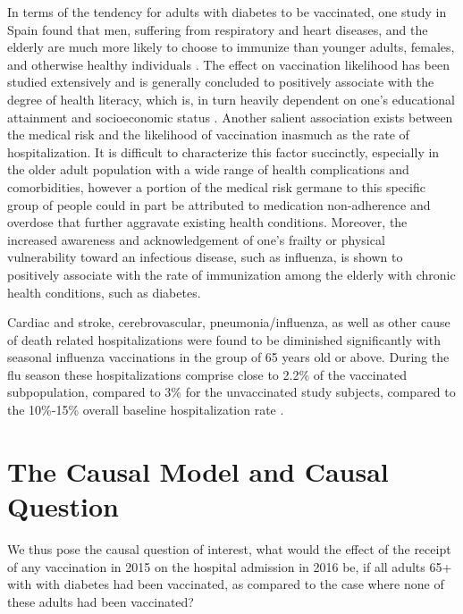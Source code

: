 \documentclass[english, 12pt]{article}
\begin{document}
In terms of the tendency for adults with diabetes to be vaccinated, one study in Spain found that men, suffering from respiratory and heart diseases, and the elderly are much more likely to choose to immunize than younger adults, females, and otherwise healthy individuals \cite{Jimenez-Garcia}. The effect on vaccination likelihood has been studied extensively and is generally concluded to  positively associate with the degree of health literacy, which is, in turn heavily dependent on one’s educational attainment and socioeconomic status \cite{Howard}. Another salient association exists between the medical risk and the likelihood of vaccination inasmuch as the rate of hospitalization. It is difficult to characterize this factor succinctly, especially in the older adult population with a wide range of health complications and comorbidities, however a portion of the medical risk germane to this specific group of people could in part be attributed to medication non-adherence and overdose \cite{Ho,Budnitz} that further aggravate existing health conditions. Moreover, the increased awareness and acknowledgement of one’s frailty or physical vulnerability toward an infectious disease, such as influenza, is shown to positively associate with the rate of immunization among the elderly with chronic health conditions, such as diabetes.

Cardiac and stroke, cerebrovascular, pneumonia/influenza, as well as other cause of death related hospitalizations were found to be diminished significantly with seasonal influenza vaccinations in the group of 65 years old or above. During the flu season these hospitalizations comprise close to 2.2\% of the vaccinated subpopulation, compared to 3\% for the unvaccinated study subjects, compared to the 10\%-15\% overall baseline hospitalization rate \cite{Nichol}. 

\section{The Causal Model and Causal Question}
We thus pose the causal question of interest, what would the effect of the receipt of any vaccination in 2015 on the hospital admission in 2016 be, if all adults 65+ with with diabetes had been vaccinated, as compared to the case where none of these adults had been vaccinated?
\end{document}
